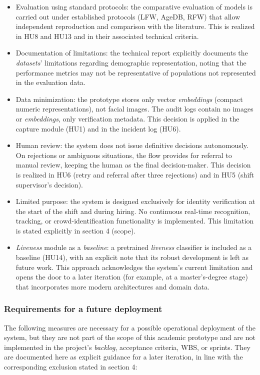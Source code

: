 \documentclass[
  11pt, %
]{charter}
\begin{document}
\begin{itemize}
  \item Evaluation using standard protocols: the comparative evaluation of models is carried out under established protocols (LFW, AgeDB, RFW) that allow independent reproduction and comparison with the literature. This is realized in HU8 and HU13 and in their associated technical criteria.
  \item Documentation of limitations: the technical report explicitly documents the \textit{datasets}' limitations regarding demographic representation, noting that the performance metrics may not be representative of populations not represented in the evaluation data.
  \item Data minimization: the prototype stores only vector \textit{embeddings} (compact numeric representations), not facial images. The audit logs contain no images or \textit{embeddings}, only verification metadata. This decision is applied in the capture module (HU1) and in the incident log (HU6).
  \item Human review: the system does not issue definitive decisions autonomously. On rejections or ambiguous situations, the flow provides for referral to manual review, keeping the human as the final decision-maker. This decision is realized in HU6 (retry and referral after three rejections) and in HU5 (shift supervisor's decision).
  \item Limited purpose: the system is designed exclusively for identity verification at the start of the shift and during hiring. No continuous real-time recognition, tracking, or crowd-identification functionality is implemented. This limitation is stated explicitly in section 4 (scope).
  \item \textit{Liveness} module as a \textit{baseline}: a pretrained \textit{liveness} classifier is included as a baseline (HU14), with an explicit note that its robust development is left as future work. This approach acknowledges the system's current limitation and opens the door to a later iteration (for example, at a master's-degree stage) that incorporates more modern architectures and domain data.
\end{itemize}

\subsubsection{Requirements for a future deployment}

The following measures are necessary for a possible operational deployment of the system, but they are not part of the scope of this academic prototype and are not implemented in the project's \textit{backlog}, acceptance criteria, WBS, or sprints. They are documented here as explicit guidance for a later iteration, in line with the corresponding exclusion stated in section 4:
\end{document}
